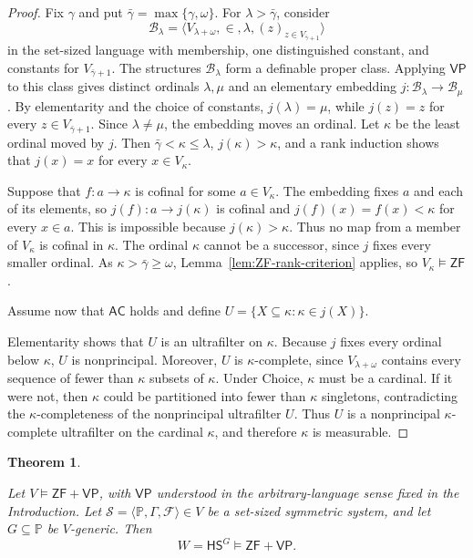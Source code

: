 \documentclass[11pt,a4paper]{amsart}
\newcommand{\VP}{\mathsf{VP}}
\newcommand{\AC}{\mathsf{AC}}
\newcommand{\ZF}{\mathsf{ZF}}
\newcommand{\HS}{\mathsf{HS}}
\theoremstyle{plain}
\newtheorem{theorem}{Theorem}[section]
\theoremstyle{definition}
\theoremstyle{remark}
\begin{document}
\begin{proof}

Fix $\gamma$ and put $\bar\gamma=\max\{\gamma,\omega\}$.  For $\lambda>\bar\gamma$, consider
\[
\mathcal B_\lambda=\bigl\langle V_{\lambda+\omega},\in,\lambda,
(z)_{z\in V_{\bar\gamma+1}}\bigr\rangle
\]
 in the set-sized language with membership, one distinguished constant, and constants for $V_{\bar\gamma+1}$.  The structures $\mathcal B_\lambda$ form a definable proper class.  Applying $\VP$ to this class gives distinct ordinals $\lambda,\mu$ and an elementary embedding $j:\mathcal B_\lambda\longrightarrow\mathcal B_\mu$.
By elementarity and the choice of constants, $j(\lambda)=\mu$, while $j(z)=z$ for every $z\in V_{\bar\gamma+1}$.  Since $\lambda\ne\mu$, the embedding moves an ordinal.  Let $\kappa$ be the least ordinal moved by $j$.  Then $\bar\gamma<\kappa\leq\lambda$, $j(\kappa)>\kappa$, and a rank induction shows that $j(x)=x$ for every $x\in V_\kappa$.

 Suppose that $f:a\to\kappa$ is cofinal for some $a\in V_\kappa$.  The embedding fixes $a$ and each of its elements, so $j(f):a\to j(\kappa)$ is cofinal and $j(f)(x)=f(x)<\kappa$ for every $x\in a$.  This is impossible because $j(\kappa)>\kappa$.  Thus no map from a member of $V_\kappa$ is cofinal in $\kappa$.  The ordinal $\kappa$ cannot be a successor, since $j$ fixes every smaller ordinal.  As $\kappa>\bar\gamma\geq\omega$, Lemma~\ref{lem:ZF-rank-criterion} applies, so $V_\kappa\models\ZF$.

Assume now that $\AC$ holds and define $U=\{X\subseteq\kappa:\kappa\in j(X)\}$.

Elementarity shows that $U$ is an ultrafilter on $\kappa$.  Because $j$ fixes every ordinal below $\kappa$, $U$ is nonprincipal.  Moreover, $U$ is $\kappa$-complete, since $V_{\lambda+\omega}$ contains every sequence of fewer than $\kappa$ subsets of $\kappa$.  Under Choice, $\kappa$ must be a cardinal.  If it were not, then $\kappa$ could be partitioned into fewer than $\kappa$ singletons, contradicting the $\kappa$-completeness of the nonprincipal ultrafilter $U$.  Thus $U$ is a nonprincipal $\kappa$-complete ultrafilter on the cardinal $\kappa$, and therefore $\kappa$ is measurable.
\end{proof}

\begin{theorem}\label{thm:preservation}

Let $V\models\ZF+\VP$, with $\VP$ understood in the arbitrary-language sense fixed in the Introduction.  Let $\mathscr S=\langle\mathbb P,\Gamma,\mathcal F\rangle\in V$ be a set-sized symmetric system, and let $G\subseteq\mathbb P$ be $V$-generic.  Then
\[
W=\HS^G\models\ZF+\VP.
\]
\end{theorem}
\end{document}

